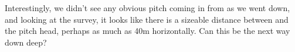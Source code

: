 Interestingly, we didn’t see any obvious pitch coming in from  as we went down, and looking at the survey, it looks like there is a sizeable distance between  and the pitch head, perhaps as much as 40m horizontally. Can this be the next way down deep?

